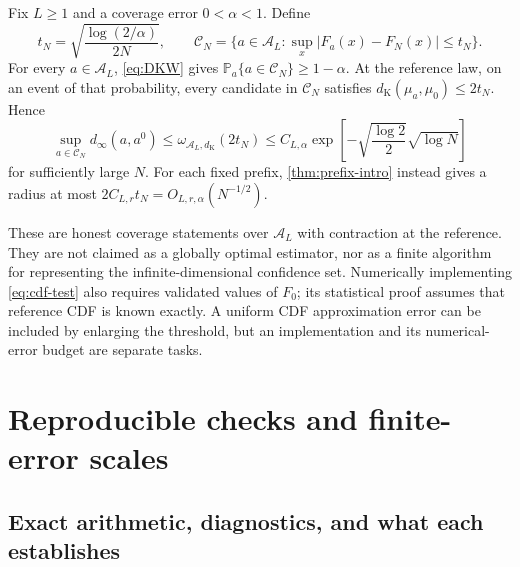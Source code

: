 \documentclass[11pt,a4paper]{article}
\numberwithin{equation}{section}
\theoremstyle{definition}
\theoremstyle{remark}
\newcommand{\PP}{\mathbb P}
\newcommand{\A}{\mathcal A}
\newcommand{\distK}{d_{\mathrm K}}
\begin{document}
Fix $L\ge1$ and a coverage error $0<\alpha<1$. Define
\begin{equation}
 t_N=\sqrt{\frac{\log(2/\alpha)}{2N}},\qquad
 \mathcal C_N=\{a\in\A_L:\sup_x|F_a(x)-F_N(x)|\le t_N\}.
 \label{eq:confidence-set}
\end{equation}
For every $a\in\A_L$, \eqref{eq:DKW} gives
$\PP_a\{a\in\mathcal C_N\}\ge1-\alpha$.
At the reference law, on an event of that probability, every candidate in
$\mathcal C_N$ satisfies $\distK(\mu_a,\mu_0)\le2t_N$.
Hence
\begin{equation}
 \sup_{a\in\mathcal C_N}d_\infty(a,a^0)
 \le\omega_{\A_L,\distK}(2t_N)
 \le C_{L,\alpha}
   \exp\left[-\sqrt{\frac{\log2}{2}}\sqrt{\log N}\right]
 \label{eq:confidence-contraction}
\end{equation}
for sufficiently large $N$. For each fixed prefix, \cref{thm:prefix-intro}
instead gives a radius at most $2C_{L,r}t_N=O_{L,r,\alpha}(N^{-1/2})$.

These are honest coverage statements over $\A_L$ with contraction at the
reference. They are not claimed as a globally optimal estimator, nor as a
finite algorithm for representing the infinite-dimensional confidence set.
Numerically implementing \eqref{eq:cdf-test} also requires validated values
of $F_0$; its statistical proof assumes that reference CDF is known exactly.
A uniform CDF approximation error can be included by enlarging the threshold,
but an implementation and its numerical-error budget are separate tasks.

\section{Reproducible checks and finite-error scales}
\label{sec:checks}

\subsection{Exact arithmetic, diagnostics, and what each establishes}
\end{document}
